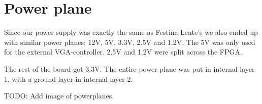 \section {Power plane}

Since our power supply was exactly the same as Festina Lente's we also ended up
with similar power planes; 12V, 5V, 3.3V, 2.5V and 1.2V. The 5V was only used
for the external VGA-controller. 2.5V and 1.2V were split across the FPGA.

The rest of the board got 3.3V. The entire power plane was put in internal layer 1,
with a ground layer in internal layer 2.

TODO: Add image of powerplanes.
